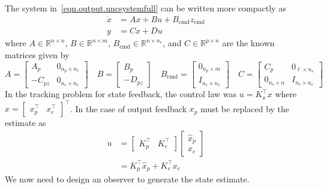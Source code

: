The system in~\eqref{eqn.output.uncsystemfull} can be written more compactly as
\begin{equation}
  \begin{split}
    \dot{x}&=Ax+Bu+B_{\text{cmd}}z_{\text{cmd}} \\
    y&=Cx+Du
  \end{split}
\end{equation}
where $A\in\mathbb{R}^{n\times n}$, $B\in\mathbb{R}^{n\times m}$, $B_{\text{cmd}}\in\mathbb{R}^{n\times n_{e}}$, and $C\in\mathbb{R}^{p\times n}$ are the known matrices given by
\begin{equation*}
  A=
  \begin{bmatrix}
    A_{p} & 0_{n_{p}\times n_{e}} \\
    -C_{pz} & 0_{n_{e}\times n_{e}}
  \end{bmatrix} \quad
  B=
  \begin{bmatrix}
    B_{p} \\
    -D_{pz}
  \end{bmatrix}
  \quad
  B_{\text{cmd}}=
  \begin{bmatrix}
    0_{n_{p}\times m} \\
    I_{n_{e}\times n_{e}}
  \end{bmatrix}
  \quad
  C=
  \begin{bmatrix}
    C_{p} & 0_{\ell\times n_{e}} \\
    0_{n_{e}\times n} & I_{n_{e}\times n_{e}}
  \end{bmatrix}
\end{equation*}
In the tracking problem for state feedback, the control law was $u=K_{x}^{\top}x$ where $x=\begin{bmatrix} x_{p}^{\top} & x_{e}^{\top} \end{bmatrix}^{\top}$.
In the case of output feedback $x_{p}$ must be replaced by the estimate as
\begin{equation*}
  \begin{split}
    u&=
    \left[
      \begin{array}{cc}
        K_{p}^{\top} & K_{e}^{\top}
      \end{array}
    \right]
    \left[
      \begin{array}{c}
        \hat{x}_{p} \\
        x_{e}
      \end{array}
    \right] \\
    &=K_{p}^{\top}\hat{x}_{p}+K_{e}^{\top}x_{e}
  \end{split}
\end{equation*}
We now need to design an observer to generate the state estimate.

